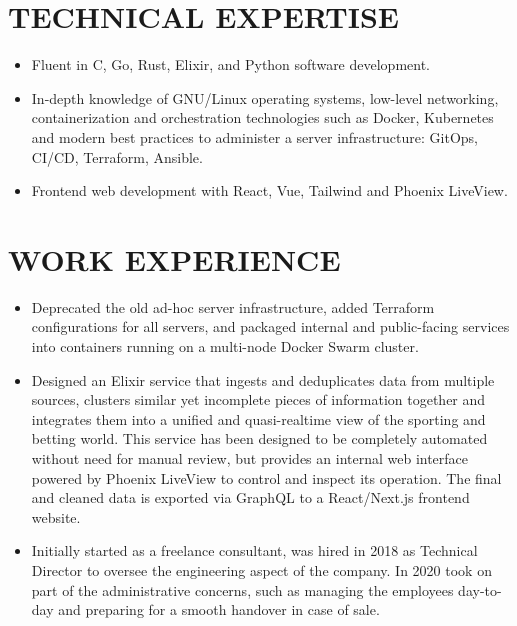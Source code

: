 \documentclass{resume}
\begin{document}

\section{TECHNICAL EXPERTISE}

\begin{itemize}
\item Fluent in C, Go, Rust, Elixir, and Python software development.
\item In-depth knowledge of GNU/Linux operating systems, low-level networking, containerization and orchestration technologies such as Docker, Kubernetes and modern best practices to administer a server infrastructure: GitOps, CI/CD, Terraform, Ansible.
\item Frontend web development with React, Vue, Tailwind and Phoenix LiveView.
\end{itemize}

\section{WORK EXPERIENCE}


\begin{itemize}
\item Deprecated the old ad-hoc server infrastructure, added Terraform configurations for all servers, and packaged internal and public-facing services into containers running on a multi-node Docker Swarm cluster.
\item Designed an Elixir service that ingests and deduplicates data from multiple sources, clusters similar yet incomplete pieces of information together and integrates them into a unified and quasi-realtime view of the sporting and betting world. This service has been designed to be completely automated without need for manual review, but provides an internal web interface powered by Phoenix LiveView to control and inspect its operation. The final and cleaned data is exported via GraphQL to a React/Next.js frontend website.
\item Initially started as a freelance consultant, was hired in 2018 as Technical Director to oversee the engineering aspect of the company. In 2020 took on part of the administrative concerns, such as managing the employees day-to-day and preparing for a smooth handover in case of sale.
\end{itemize}
\end{document}
